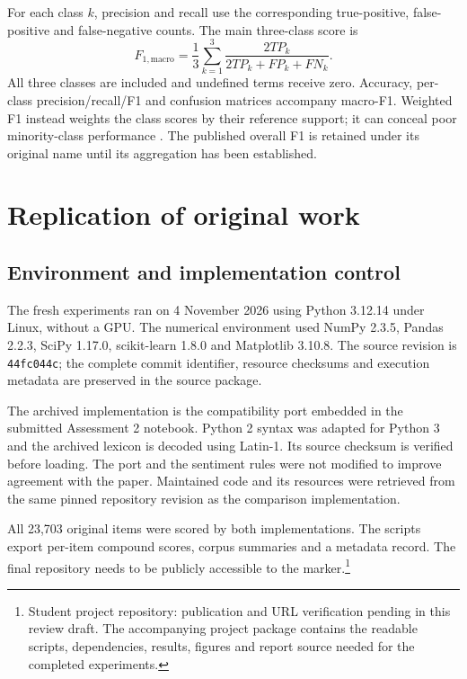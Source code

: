 \documentclass[11pt]{article}
\begin{document}
For each class $k$, precision and recall use the corresponding true-positive,
false-positive and false-negative counts. The main three-class score is
\begin{equation}
F_{1,\mathrm{macro}}=\frac{1}{3}\sum_{k=1}^{3}
\frac{2TP_k}{2TP_k+FP_k+FN_k}.
\end{equation}
All three classes are included and undefined terms receive zero. Accuracy,
per-class precision/recall/F1 and confusion matrices accompany macro-F1. Weighted
F1 instead weights the class scores by their reference support; it can conceal
poor minority-class performance \citep{sklearnMetrics}. The published overall F1
is retained under its original name until its aggregation has been established.

\section{Replication of original work}

\subsection{Environment and implementation control}
The fresh experiments ran on 4 November 2026 using Python 3.12.14 under Linux,
without a GPU. The numerical environment used NumPy 2.3.5, Pandas 2.2.3,
SciPy 1.17.0, scikit-learn 1.8.0 and Matplotlib 3.10.8. The source revision is
\texttt{44fc044c}; the complete commit identifier, resource checksums and execution
metadata are preserved in the source package.

The archived implementation is the compatibility port embedded in the submitted
Assessment 2 notebook. Python 2 syntax was adapted for Python 3 and the archived
lexicon is decoded using Latin-1. Its source checksum is verified before loading.
The port and the sentiment rules were not modified to improve agreement with
the paper. Maintained code and its resources were retrieved from the same pinned
repository revision as the comparison implementation.

All 23,703 original items were scored by both implementations. The scripts export
per-item compound scores, corpus summaries and a metadata record. The final
repository needs to be publicly accessible to the marker.\footnote{Student project
repository: publication and URL verification pending in this review draft. The
accompanying project package contains the readable scripts, dependencies, results,
figures and report source needed for the completed experiments.}
\end{document}
